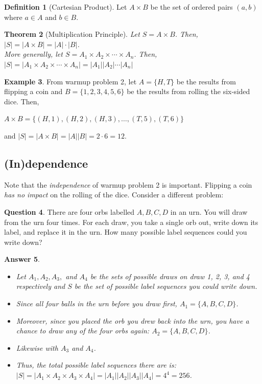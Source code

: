 \documentclass[openany]{book}
\newtheorem{thm}{Theorem}[section]
\newtheorem{answer}[thm]{Answer}
\theoremstyle{definition}
\newtheorem{definition}[thm]{Definition}
\newtheorem{question}[thm]{Question}
\newtheorem{example}[thm]{Example}
\begin{document}
\begin{definition}[Cartesian Product]\hfill

    Let $A\times B$ be the set of ordered pairs $(a,b)$ where $a\in A$ and $b\in B$.
\end{definition}
\begin{thm}[Multiplication Principle]\hfill

    Let $S=A\times B$. Then, $|S|=|A\times B|=|A|\cdot|B|$.\\ 
    More generally, let $S=A_1\times A_2\times \cdots \times A_n$. Then, $|S|=|A_1\times A_2\times \cdots \times A_n|=|A_1||A_2|\cdots|A_n|$
\end{thm}
\begin{example}\hfill

    From warmup problem 2, let $A=\{H,T\}$ be the results from flipping a coin and $B=\{1,2,3,4,5,6\}$ be the results from rolling the six-sided dice. Then,
    \begin{center}
    $A\times B=\{(H,1),(H,2),(H,3),\dots,(T,5),(T,6)\}$
    \end{center}
    and $|S|=|A\times B|=|A||B|=2\cdot 6=12$.
\end{example}


\subsection{(In)dependence}
Note that the \emph{independence} of warmup problem 2 is important. Flipping a coin \emph{has no impact} on the rolling of the dice. Consider a different problem:
\begin{question}\hfill

    There are four orbs labelled $A,B,C,D$ in an urn. You will draw from the urn four times. For each draw, you take a single orb out, write down its label, and replace it in the urn. How many possible label sequences could you write down?
\end{question}
\begin{answer}
    
    \begin{itemize}
        \item Let $A_1, A_2, A_3,$ and $A_4$ be the sets of possible draws on draw 1, 2, 3, and 4 respectively and $S$ be the set of possible label sequences you could write down.  
        \item Since all four balls in the urn before you draw first, $A_1=\{A,B,C,D\}$.
        \item Moreover, since you placed the orb you drew back into the urn, you have a chance to draw any of the four orbs again: $A_2=\{A,B,C,D\}$.
        \item Likewise with $A_3$ and $A_4$.
        \item Thus, the total possible label sequences there are is: $|S|=|A_1\times A_2\times A_3\times A_4|=|A_1||A_2||A_3||A_4|=4^4=256$.
\end{itemize}
\end{answer}
\end{document}
